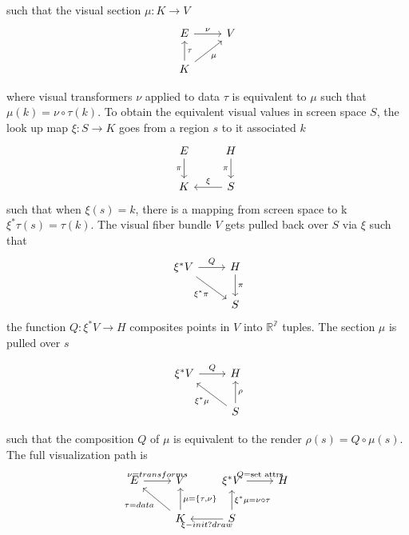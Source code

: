 \documentclass[../main.tex]{subfiles}
\begin{document}
such that the visual section $\mu: K \rightarrow V$ 
\begin{equation}
    \begin{tikzcd}
        E \arrow[r, "\nu"]                      & V \\
        K \arrow[ru, "\mu"'] \arrow[u, "\tau"'] &  
        \end{tikzcd}

\end{equation}

where visual transformers $\nu$ applied to data $\tau$ is equivalent to $\mu$ such that $\mu(k) = \nu\circ\tau(k)$. To obtain the equivalent visual values in screen space $S$, the look up map $\xi: S \rightarrow K$ goes from a region $s$ to it associated $k$
\begin{equation}
    \begin{tikzcd}
        E \arrow[d, "\pi"'] & H \arrow[d, "\pi"'] \\
        K                   & S \arrow[l, "\xi"']
        \end{tikzcd}
\end{equation}
such that when $\xi(s) = k$, there is a mapping from screen space to k  $\xi^*\tau(s) = \tau(k)$. The visual fiber bundle $V$ gets pulled back over $S$ via $\xi$ such that 
\begin{equation}
    \begin{tikzcd}
        \xi^*V \arrow[r, "Q"] \arrow[rd, "\xi^*\pi"'] & H \arrow[d, "\pi"] \\
                                                      & S                 
    \end{tikzcd}
\end{equation}
the function $Q:\xi^*V\rightarrow H$ composites points in $V$ into $\mathbb{R^7}$ tuples. The section $\mu$ is pulled over $s$ 

\begin{equation}
    \begin{tikzcd}
        \xi^*V \arrow[r, "Q"] & H                                           \\
                              & S \arrow[lu, "\xi^*\mu"] \arrow[u, "\rho"']
    \end{tikzcd}
\end{equation}

such that the composition $Q$ of $\mu$ is equivalent to the render $\rho(s) = Q\circ\mu(s)$. The full visualization path is
\begin{equation} 
    \begin{tikzcd}
        E \arrow[r, "\nu=transforms"] & V                                                              & \xi^*V \arrow[r, "Q = \text{set attrs}"]                             & H \\
                                  & K \arrow[lu, "\tau = data"] \arrow[u, "{\mu = \{\tau,\nu\}}"'] & S \arrow[l, "\xi - init?draw"] \arrow[u, "\xi^*\mu = \nu\circ\tau"'] &  
    \end{tikzcd}
\end{equation}
\end{document}
